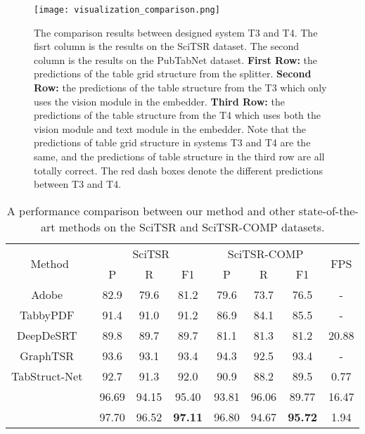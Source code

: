 \documentclass[review]{elsarticle}
\begin{document}
\begin{figure*}[!htb]
	\centerline{\texttt{[image: visualization\_comparison.png]}}
	\caption{The comparison results between designed system T3 and T4. The fisrt column is the results on the SciTSR dataset. The second column is the results on the PubTabNet dataset.  \textbf{First Row:} the predictions of the table grid structure from the splitter. \textbf{Second Row:} the predictions of the table structure from the T3 which only uses the vision module in the embedder. \textbf{Third Row:} the predictions of the table structure from the T4 which uses both the vision module and text module in the embedder. Note that the predictions of table grid structure in systems T3 and T4 are the same, and the predictions of table structure in the third row are all totally correct. The red dash boxes denote the different predictions between T3 and T4.}
	\label{visualization_comparison}
\end{figure*}


\begin{table}[!htb]
	\centering
	\renewcommand\arraystretch{1.1}
	\setlength{\tabcolsep}{2.2mm}
	
	\caption{A performance comparison between our method and other state-of-the-art methods on the SciTSR and SciTSR-COMP datasets.}
	\label{scitsr-comparison}
	\begin{tabular}{c|c|c|c|c|c|c|c}
		\hline
		\multirow{2}{*}{Method} & \multicolumn{3}{c|}{SciTSR} & \multicolumn{3}{c|}{SciTSR-COMP} & \multirow{2}{*}{FPS} \\ \cline{2-7} 
										   & P       & R       & F1      & P      & R        & F1 		& 		\\ \hline
		Adobe~\cite{DeepDeSRT}	           & 82.9    & 79.6    & 81.2    & 79.6   & 73.7     & 76.5  	& -		\\
		TabbyPDF~\cite{TabbyPDF}           & 91.4    & 91.0    & 91.2    & 86.9   & 84.1     & 85.5 	& -		\\
		DeepDeSRT~\cite{DeepDeSRT}         & 89.8    & 89.7    & 89.7    & 81.1   & 81.3     & 81.2 	& 20.88				\\
		GraphTSR~\cite{GraphTSR}           & 93.6    & 93.1    & 93.4    & 94.3   & 92.5     & 93.4 	& - 									\\
		TabStruct-Net~\cite{TabStructNet}  & 92.7    & 91.3    & 92.0    & 90.9   & 88.2     & 89.5 	& 0.77				\\ \hline
				       & 96.69   & 94.15   & 95.40   & 93.81  & 96.06    & 89.77 	& 16.47				\\
		    		   & 97.70   & 96.52   & \textbf{97.11}   & 96.80    & 94.67  & \textbf{95.72} & 1.94 \\ \hline
	\end{tabular}
\end{table}
\end{document}

